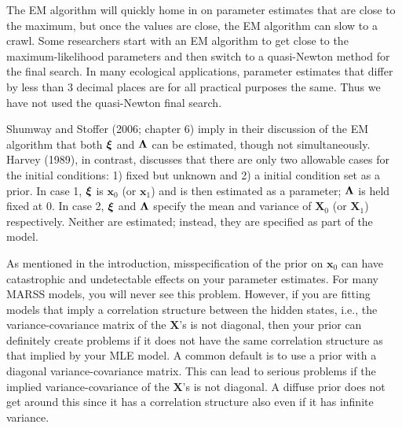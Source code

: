 \documentclass[]{article}
\def\xixi{\mbox{\boldmath $\xi$}}
\def\LAM{\mbox{\boldmath $\Lambda$}}
\def\XX{\mbox{$\pmb{X}$}}	\def\xx{\mbox{$\pmb{x}$}}
\begin{document}
The EM algorithm will quickly home in on parameter estimates that are close to the maximum, but once the values are close, the EM algorithm can slow to a crawl.   Some researchers start with an EM algorithm to get close to the maximum-likelihood parameters and then switch to a quasi-Newton method for the final search.  In many ecological applications, parameter estimates that differ by less than 3 decimal places are for all practical purposes the same.  Thus we have not used the quasi-Newton final search.

Shumway and Stoffer (2006; chapter 6) imply in their discussion of the EM algorithm that both $\xixi$ and $\LAM$ can be  estimated, though not simultaneously.  Harvey (1989), in contrast, discusses that there are only two allowable cases for the initial conditions: 1) fixed but unknown and 2) a initial condition set as a prior. In case 1, $\xixi$ is $\xx_0$ (or $\xx_1$) and is then estimated as a parameter; $\LAM$ is held fixed at 0.  In case 2, $\xixi$ and $\LAM$ specify the mean and variance of $\XX_0$ (or $\XX_1$) respectively. Neither are estimated; instead, they are specified as part of the model.  

As mentioned in the introduction, misspecification of the prior on $\xx_0$ can have catastrophic and undetectable effects on your parameter estimates.  For many MARSS models, you will never see this problem.  However, if you are fitting models that imply a correlation structure between the hidden states, i.e., the variance-covariance matrix of the $\XX$'s is not diagonal, then your prior can definitely create problems if it does not have the same correlation structure as that implied by your MLE model.  A common default is to use a prior with a diagonal variance-covariance matrix.  This can lead to serious problems if the implied variance-covariance of the $\XX$'s is not diagonal.  A diffuse prior does not get around this since it has a correlation structure also even if it has infinite variance.  
\end{document}
